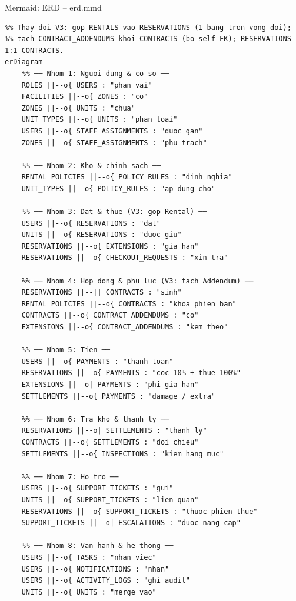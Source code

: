 \documentclass[12pt,a4paper]{article}
\renewcommand{\_}{\textunderscore\allowbreak}
\begin{document}
\begin{mermaidbox}{Mermaid: ERD -- erd.mmd}
\begin{Verbatim}[fontsize=\small]
%% StorageHub - ERD (crow's foot) - 22 thuc the, 8 nhom - V3 2026-09-18
%% Thay doi V3: gop RENTALS vao RESERVATIONS (1 bang tron vong doi);
%% tach CONTRACT_ADDENDUMS khoi CONTRACTS (bo self-FK); RESERVATIONS 1:1 CONTRACTS.
erDiagram
    %% ── Nhom 1: Nguoi dung & co so ──
    ROLES ||--o{ USERS : "phan vai"
    FACILITIES ||--o{ ZONES : "co"
    ZONES ||--o{ UNITS : "chua"
    UNIT_TYPES ||--o{ UNITS : "phan loai"
    USERS ||--o{ STAFF_ASSIGNMENTS : "duoc gan"
    ZONES ||--o{ STAFF_ASSIGNMENTS : "phu trach"

    %% ── Nhom 2: Kho & chinh sach ──
    RENTAL_POLICIES ||--o{ POLICY_RULES : "dinh nghia"
    UNIT_TYPES ||--o{ POLICY_RULES : "ap dung cho"

    %% ── Nhom 3: Dat & thue (V3: gop Rental) ──
    USERS ||--o{ RESERVATIONS : "dat"
    UNITS ||--o{ RESERVATIONS : "duoc giu"
    RESERVATIONS ||--o{ EXTENSIONS : "gia han"
    RESERVATIONS ||--o{ CHECKOUT_REQUESTS : "xin tra"

    %% ── Nhom 4: Hop dong & phu luc (V3: tach Addendum) ──
    RESERVATIONS ||--|| CONTRACTS : "sinh"
    RENTAL_POLICIES ||--o{ CONTRACTS : "khoa phien ban"
    CONTRACTS ||--o{ CONTRACT_ADDENDUMS : "co"
    EXTENSIONS ||--o{ CONTRACT_ADDENDUMS : "kem theo"

    %% ── Nhom 5: Tien ──
    USERS ||--o{ PAYMENTS : "thanh toan"
    RESERVATIONS ||--o{ PAYMENTS : "coc 10% + thue 100%"
    EXTENSIONS ||--o| PAYMENTS : "phi gia han"
    SETTLEMENTS ||--o{ PAYMENTS : "damage / extra"

    %% ── Nhom 6: Tra kho & thanh ly ──
    RESERVATIONS ||--o| SETTLEMENTS : "thanh ly"
    CONTRACTS ||--o{ SETTLEMENTS : "doi chieu"
    SETTLEMENTS ||--o{ INSPECTIONS : "kiem hang muc"

    %% ── Nhom 7: Ho tro ──
    USERS ||--o{ SUPPORT_TICKETS : "gui"
    UNITS ||--o{ SUPPORT_TICKETS : "lien quan"
    RESERVATIONS ||--o{ SUPPORT_TICKETS : "thuoc phien thue"
    SUPPORT_TICKETS ||--o| ESCALATIONS : "duoc nang cap"

    %% ── Nhom 8: Van hanh & he thong ──
    USERS ||--o{ TASKS : "nhan viec"
    USERS ||--o{ NOTIFICATIONS : "nhan"
    USERS ||--o{ ACTIVITY_LOGS : "ghi audit"
    UNITS ||--o{ UNITS : "merge vao"


\end{Verbatim}
\end{mermaidbox}
\end{document}
